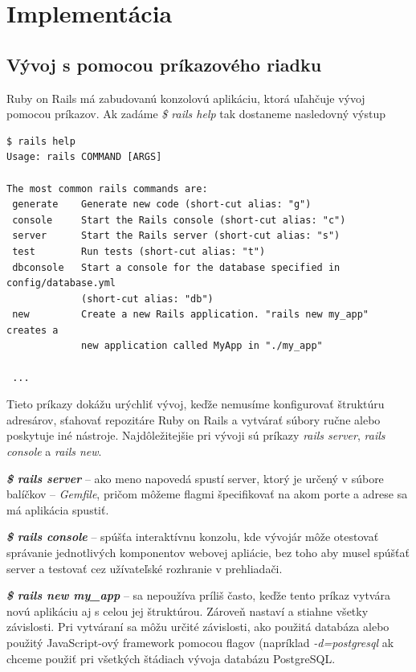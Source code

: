 \chapter{Implementácia}

\section{Vývoj s pomocou príkazového riadku}

Ruby on Rails má zabudovanú konzolovú aplikáciu, ktorá uľahčuje vývoj pomocou príkazov. Ak zadáme \emph{\$ rails help} tak dostaneme nasledovný výstup

\begin{verbatim}
$ rails help
Usage: rails COMMAND [ARGS]

The most common rails commands are:
 generate    Generate new code (short-cut alias: "g")
 console     Start the Rails console (short-cut alias: "c")
 server      Start the Rails server (short-cut alias: "s")
 test        Run tests (short-cut alias: "t")
 dbconsole   Start a console for the database specified in config/database.yml
             (short-cut alias: "db")
 new         Create a new Rails application. "rails new my_app" creates a
             new application called MyApp in "./my_app"

 ...
\end{verbatim}

\clearpage
Tieto príkazy dokážu urýchliť vývoj, keďže nemusíme konfigurovať štruktúru adresárov, sťahovať repozitáre Ruby on Rails a vytvárať súbory ručne alebo poskytuje iné nástroje.
Najdôležitejšie pri vývoji sú príkazy \emph{rails server}, \emph{rails console} a \emph{rails new}. 


\textbf{\emph{\$ rails server}} -- ako meno napovedá spustí server, ktorý je určený v súbore balíčkov -- \emph{Gemfile}, pričom môžeme flagmi špecifikovať na akom porte a adrese sa má aplikácia spustiť.

\textbf{\emph{\$ rails console}} -- spúšťa interaktívnu konzolu, kde vývojár môže otestovať správanie jednotlivých komponentov webovej apliácie, bez toho aby musel spúšťať server a testovať cez užívateľské rozhranie v prehliadači.

\textbf{\emph{\$ rails new my\_app}} -- sa nepoužíva príliš často, keďže tento príkaz vytvára novú aplikáciu aj s celou jej štruktúrou. Zároveň nastaví a stiahne všetky závislosti. Pri vytváraní sa môžu určité závislosti, ako použitá databáza alebo použitý JavaScript-ový framework pomocou flagov (napríklad \emph{-d=postgresql} ak chceme použiť pri všetkých štádiach vývoja databázu PostgreSQL.

